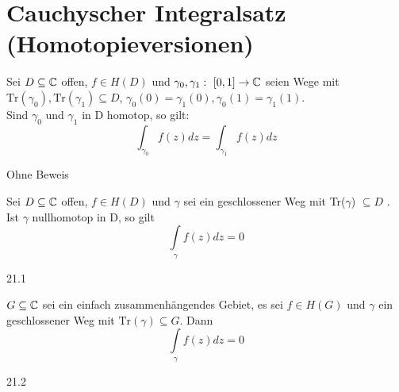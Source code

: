 \documentclass[a4paper,twoside,DIV15,BCOR12mm]{scrbook}
\def\Tr{\text{Tr}}
\def\wegint{\ensuremath{\int\limits_\gamma}}
\begin{document}
\chapter{Cauchyscher Integralsatz (Homotopieversionen)} 

\begin{satz}
Sei $D\subseteq\mathbb{C}$ offen, $f\in H(D)$ und $\gamma_0,\gamma_1:\ [0,1]\to\mathbb{C}$ seien Wege mit $\Tr(\gamma_0),\Tr(\gamma_1)\subseteq D$, $\gamma_0(0)=\gamma_1(0),\gamma_0(1)=\gamma_1(1)$.\\
Sind $\gamma_0$ und $\gamma_1$ in D homotop, so gilt:
\[\int_{\gamma_0}f(z)dz=\int_{\gamma_1}f(z)dz\]
\end{satz}
\begin{beweis}
Ohne Beweis\end{beweis}

\begin{satz}
Sei $D\subseteq\mathbb{C}$ offen, $f\in H(D)$ und $\gamma$ sei ein geschlossener Weg mit Tr($\gamma$)
$\subseteq D$ . \\
Ist $\gamma$ nullhomotop in D, so gilt
\[\wegint f(z)dz=0\] 
\end{satz}
\begin{beweis}
21.1\end{beweis}

\begin{satz} 
$G\subseteq\mathbb{C}$ sei ein einfach zusammenhängendes Gebiet, es sei $f\in H(G)$ und $\gamma$ ein geschlossener Weg mit $\Tr(\gamma) \subseteq G$. Dann
\[\wegint f(z)dz=0\]
\end{satz}
\begin{beweis}
21.2\end{beweis}
\end{document}
